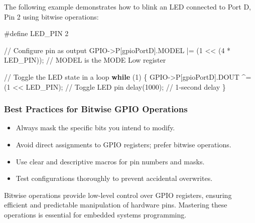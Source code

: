 \documentclass[
  9pt,
  letterpaper,
  abstract,
  titlepage]{scrbook}
\newenvironment{Shaded}{\begin{snugshade}}{\end{snugshade}}
\newcommand{\CommentTok}[1]{\textcolor[rgb]{0.37,0.37,0.37}{#1}}
\newcommand{\ControlFlowTok}[1]{\textcolor[rgb]{0.00,0.23,0.31}{\textbf{#1}}}
\newcommand{\DecValTok}[1]{\textcolor[rgb]{0.68,0.00,0.00}{#1}}
\newcommand{\NormalTok}[1]{\textcolor[rgb]{0.00,0.23,0.31}{#1}}
\newcommand{\OperatorTok}[1]{\textcolor[rgb]{0.37,0.37,0.37}{#1}}
\newcommand{\PreprocessorTok}[1]{\textcolor[rgb]{0.68,0.00,0.00}{#1}}
\begin{document}
The following example demonstrates how to blink an LED connected to Port
D, Pin 2 using bitwise operations:

\begin{Shaded}
\begin{Highlighting}[]
\PreprocessorTok{\#define LED\_PIN }\DecValTok{2}

\CommentTok{// Configure pin as output}
\NormalTok{GPIO}\OperatorTok{{-}\textgreater{}}\NormalTok{P}\OperatorTok{[}\NormalTok{gpioPortD}\OperatorTok{].}\NormalTok{MODEL }\OperatorTok{|=} \OperatorTok{(}\DecValTok{1} \OperatorTok{\textless{}\textless{}} \OperatorTok{(}\DecValTok{4} \OperatorTok{*}\NormalTok{ LED\_PIN}\OperatorTok{));} \CommentTok{// MODEL is the MODE Low register}

\CommentTok{// Toggle the LED state in a loop}
\ControlFlowTok{while} \OperatorTok{(}\DecValTok{1}\OperatorTok{)} \OperatorTok{\{}
\NormalTok{    GPIO}\OperatorTok{{-}\textgreater{}}\NormalTok{P}\OperatorTok{[}\NormalTok{gpioPortD}\OperatorTok{].}\NormalTok{DOUT }\OperatorTok{\^{}=} \OperatorTok{(}\DecValTok{1} \OperatorTok{\textless{}\textless{}}\NormalTok{ LED\_PIN}\OperatorTok{);} \CommentTok{// Toggle LED pin}
\NormalTok{    delay}\OperatorTok{(}\DecValTok{1000}\OperatorTok{);} \CommentTok{// 1{-}second delay}
\OperatorTok{\}}
\end{Highlighting}
\end{Shaded}

\subsubsection{Best Practices for Bitwise GPIO
Operations}\label{best-practices-for-bitwise-gpio-operations}

\begin{itemize}
\item
  Always mask the specific bits you intend to modify.
\item
  Avoid direct assignments to GPIO registers; prefer bitwise operations.
\item
  Use clear and descriptive macros for pin numbers and masks.
\item
  Test configurations thoroughly to prevent accidental overwrites.
\end{itemize}

Bitwise operations provide low-level control over GPIO registers,
ensuring efficient and predictable manipulation of hardware pins.
Mastering these operations is essential for embedded systems
programming.
\end{document}
